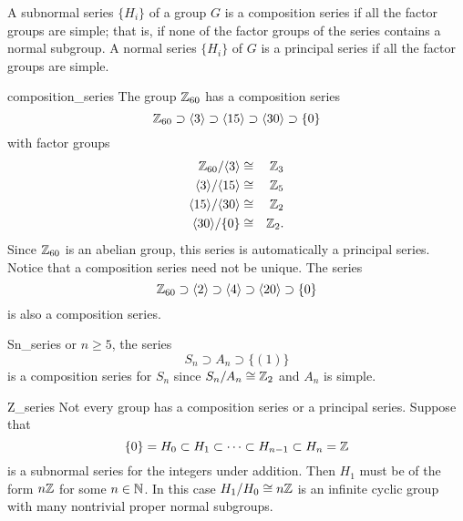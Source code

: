 

 
 
A subnormal series $\{ H_i \}$ of a group $G$ is a {\bfi composition
series\/} if all the factor groups are 
simple; that is, if none of the factor groups of the series contains a
normal subgroup. A normal series $\{ H_i \}$ of $G$ is a {\bfi 
principal series\/} if all the factor groups 
are simple.  
 
 
 
\begin{example}{composition_series}
The group ${\Bbb Z}_{60}$ has  a composition series 
\[
{\Bbb Z}_{60} \supset \langle 3 \rangle \supset  \langle 15 \rangle
\supset \langle 30 \rangle  \supset \{ 0 \}
\]
with factor groups
\begin{eqnarray*}
{\Bbb Z}_{60} / \langle 3 \rangle & \cong & {\Bbb Z}_{3} \\
\langle 3 \rangle / \langle 15 \rangle & \cong & {\Bbb Z}_{5} \\
\langle 15 \rangle / \langle 30 \rangle & \cong & {\Bbb Z}_{2} \\
\langle 30 \rangle / \{ 0 \} & \cong & {\Bbb Z}_2.
\end{eqnarray*}
Since ${\Bbb Z}_{60}$ is an abelian group, this series is
automatically a principal series. Notice that a composition series
need not be unique.  The series 
\[
{\Bbb Z}_{60} \supset \langle 2 \rangle \supset \langle 4 \rangle 
\supset  \langle 20 \rangle \supset \{ 0 \}
\]
is also a composition series.
\end{example}
 
 
 
\begin{example}{Sn_series}
or $n \geq 5$, the series
\[
S_n \supset A_n \supset \{ (1) \}
\]
is a composition series for $S_n$ since $S_n / A_n \cong {\Bbb Z}_2$
and $A_n$ is simple.
\end{example}
 
 
 
\begin{example}{Z_series}
Not every group has a composition series or a principal series.
Suppose that 
\[
\{ 0 \} = H_0 \subset H_1 \subset \cdots \subset H_{n-1}
\subset H_n = {\Bbb Z}
\]
is a subnormal series for the integers under addition. Then $H_1$ must
be of the form $n {\Bbb Z}$ for some $n \in {\Bbb N}$. In this case
$H_1 / H_0 \cong n {\Bbb Z}$ is an infinite cyclic group with many
nontrivial proper normal subgroups. 
\end{example}
 
